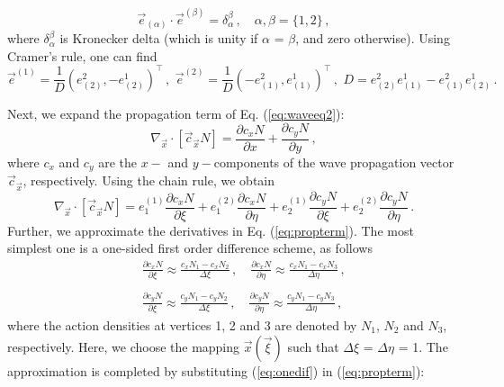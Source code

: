 \documentclass[12pt]{book}
\begin{document}
\begin{equation}
  {\vec{e}}_{(\alpha)} \cdot {\vec{e}}^{(\beta)} = \delta_{\alpha}^{\beta} \, , \quad \alpha, \beta = \{1,2\} \, ,
\end{equation}
where $\delta_{\alpha}^{\beta}$ is Kronecker delta (which is unity if $\alpha$ = $\beta$, and zero otherwise). Using Cramer's rule, one can find
\begin{equation}
  \vec{e}^{(1)} = \frac{1}{D} ( e^2_{(2)},-e^1_{(2)} )^{\top}\, ,\, \, \vec{e}^{(2)} = \frac{1}{D} (-e^2_{(1)}, e^1_{(1)} )^{\top}\, , \, \,
  D = e^2_{(2)} e^1_{(1)} - e^2_{(1)} e^1_{(2)} \, .
  \label{eq:contravar}
\end{equation}

Next, we expand the propagation term of Eq. (\ref{eq:waveeq2}):
\begin{equation}
  \nabla_{\vec{x}} \cdot [\vec{c}_{\vec{x}} N] = \frac{\partial c_x N}{\partial x} + \frac{\partial c_y N}{\partial y} \, ,
\end{equation}
where $c_x$ and $c_y$ are the $x-$ and $y-$components of the wave propagation vector $\vec{c}_{\vec{x}}$, respectively.
Using the chain rule, we obtain
\begin{equation}
  \nabla_{\vec{x}} \cdot [\vec{c}_{\vec{x}} N] = e^{(1)}_1 \frac{\partial c_x N}{\partial \xi} + e^{(2)}_1 \frac{\partial c_x N}{\partial \eta}
  + e^{(1)}_2 \frac{\partial c_y N}{\partial \xi} + e^{(2)}_2 \frac{\partial c_y N}{\partial \eta} \, .
  \label{eq:propterm}
\end{equation}
Further, we approximate the derivatives in Eq. (\ref{eq:propterm}). The most simplest one is a one-sided first order difference scheme, as follows
\begin{eqnarray}
  && \frac{\partial c_x N}{\partial \xi} \approx \frac{c_x N_1 - c_x N_2 }{\Delta \xi} \, , \quad
  \frac{\partial c_x N}{\partial \eta} \approx \frac{c_x N_1 - c_x N_3 }{\Delta \eta} \, , \nonumber \\
  && \nonumber \\
  &&\frac{\partial c_y N}{\partial \xi} \approx \frac{c_y N_1 - c_y N_2 }{\Delta \xi} \, , \quad
  \frac{\partial c_y N}{\partial \eta} \approx \frac{c_y N_1 - c_y N_3 }{\Delta \eta} \, ,
  \label{eq:onedif}
\end{eqnarray}
where the action densities at vertices 1, 2 and 3 are denoted by $N_1$, $N_2$ and $N_3$, respectively.
Here, we choose the mapping $\vec{x}(\vec{\xi})$ such that $\Delta \xi$ = $\Delta \eta$ = 1.
The approximation is completed by substituting (\ref{eq:onedif}) in (\ref{eq:propterm}):
\end{document}
